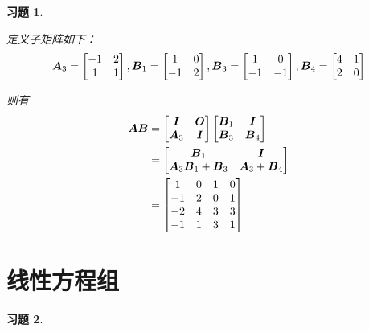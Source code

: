 \documentclass{ctexart}
\newtheorem{problem}{习题}[section]
\begin{document}
\begin{problem}\

定义子矩阵如下：
\begin{equation*}
    \boldsymbol{A}_3=
    \begin{bmatrix}
        -1 & 2 \\1&1
    \end{bmatrix},
    \boldsymbol{B}_1=
    \begin{bmatrix}
        1 & 0 \\-1&2
    \end{bmatrix},
    \boldsymbol{B}_3=
    \begin{bmatrix}
        1 & 0 \\-1&-1
    \end{bmatrix},
    \boldsymbol{B}_4=
    \begin{bmatrix}
        4 & 1 \\2&0
    \end{bmatrix}
\end{equation*}

则有
\begin{align*}
    \boldsymbol{A}\boldsymbol{B} & =
    \begin{bmatrix}
        \boldsymbol{I} & \boldsymbol{O} \\\boldsymbol{A}_3&\boldsymbol{I}
    \end{bmatrix}
    \begin{bmatrix}
        \boldsymbol{B}_1 & \boldsymbol{I} \\\boldsymbol{B}_3&\boldsymbol{B}_4
    \end{bmatrix} \\&=
    \begin{bmatrix}
        \boldsymbol{B}_1 & \boldsymbol{I} \\\boldsymbol{A}_3\boldsymbol{B}_1+\boldsymbol{B}_3&\boldsymbol{A}_3+\boldsymbol{B}_4
    \end{bmatrix} \\&=
    \begin{bmatrix}
        1  & 0 & 1 & 0 \\
        -1 & 2 & 0 & 1 \\
        -2 & 4 & 3 & 3 \\
        -1 & 1 & 3 & 1
    \end{bmatrix}
\end{align*}

\end{problem}

\clearpage
\section{线性方程组}

\setcounter{problem}{3}
\begin{problem}\



\end{problem}
\end{document}
